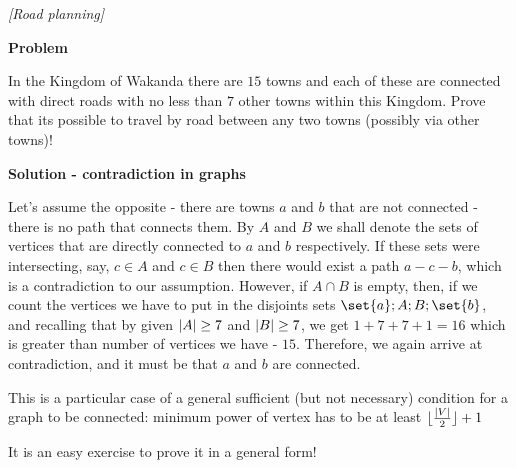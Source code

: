 \begin{problem}
\textit{[Road planning]}

\textbf{Problem}

In the Kingdom of Wakanda there are $15$ towns and each of these are connected with direct roads with no less than $7$ other towns within this Kingdom. Prove that its possible to travel by road between any two towns (possibly via other towns)!

\textbf{Solution - contradiction in graphs}

Let's assume the opposite - there are towns $a$ and $b$ that are not connected - there is no path that connects them.  By $A$ and $B$ we shall denote the sets of vertices that are directly connected to $a$ and $b$ respectively. If these sets were intersecting, say, $c \in A$ and $c \in B$ then there would exist a path $a-c-b$, which is a contradiction to our assumption. 
However, if $A \cap B$ is empty, then, if we count the vertices we have to put in the disjoints sets $\set{a}; A; B; \set{b}$, and recalling that by given $\lvert A\rvert \ge 7$ and $\lvert B\rvert \ge 7$, we get $1 + 7 + 7 + 1 = 16$ which is greater than number of vertices we have - $15$. Therefore, we again arrive at contradiction,  and it must be that $a$ and $b$ are connected.

This is a particular case of a general sufficient (but not necessary) condition for a graph to be connected: minimum power of vertex has to be at least $\lfloor\frac{\lvert V\rvert}{2}\rfloor+1$

It is an easy exercise to prove it in a general form!
\end{problem}
%

